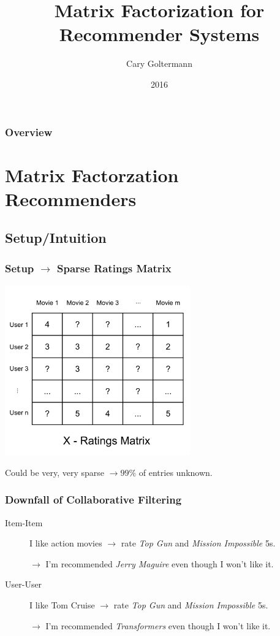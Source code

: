 \documentclass{beamer}
\title{Matrix Factorization for Recommender Systems}
\author{Cary Goltermann}
\institute{Galvanize}
\date{2016}
\begin{document}
\frame{\titlepage}

\begin{frame}
  \frametitle{Overview}
  \tableofcontents[]
\end{frame}

\section{Matrix Factorzation Recommenders}
\subsection{Setup/Intuition}
\begin{frame}
  \frametitle{Setup $\rightarrow$ Sparse Ratings Matrix}
  \begin{center}
  \includegraphics[width=0.6\textwidth]{images/ratings_matrix.png}
  \end{center}
  Could be very, very sparse $\rightarrow 99\% $ of entries unknown.
\end{frame}

\begin{frame}
  \frametitle{Downfall of Collaborative Filtering}
  \begin{description}
    \item[Item-Item] I like action movies $\rightarrow$ rate \textit{Top Gun} and \textit{Mission Impossible} 5s. \par $\rightarrow$ I'm recommended \textit{Jerry Maguire} even though I won't like it. \vspace{4mm}
    \item[User-User] I like Tom Cruise $\rightarrow$ rate \textit{Top Gun} and \textit{Mission Impossible} 5s. \par $\rightarrow$ I'm recommended \textit{Transformers} even though I won't like it.
  \end{description}
\end{frame}
\end{document}
